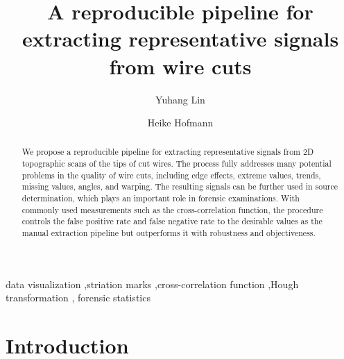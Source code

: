 \documentclass[
  authoryear,
  preprint,
  5p,
  twocolumn]{elsarticle}
\begin{document}
\begin{frontmatter}
\title{A reproducible pipeline for extracting representative signals
from wire cuts}
\author[1]{Yuhang Lin%
%
}
\author[1]{Heike Hofmann%
%
}




        
\begin{abstract}
We propose a reproducible pipeline for extracting representative signals
from 2D topographic scans of the tips of cut wires. The process fully
addresses many potential problems in the quality of wire cuts, including
edge effects, extreme values, trends, missing values, angles, and
warping. The resulting signals can be further used in source
determination, which plays an important role in forensic examinations.
With commonly used measurements such as the cross-correlation function,
the procedure controls the false positive rate and false negative rate
to the desirable values as the manual extraction pipeline but
outperforms it with robustness and objectiveness.
\end{abstract}





\begin{keyword}
    data visualization \sep striation marks \sep cross-correlation
function \sep Hough transformation \sep 
    forensic statistics
\end{keyword}
\end{frontmatter}
    
\clearpage
\newpage

\setcounter{page}{1}
\pagestyle{fancy}
\fancyhead{} 
\fancyfoot{} 
\fancyfoot[R]{\thepage}

\section{Introduction}\label{sec-Introduction}
\end{document}
